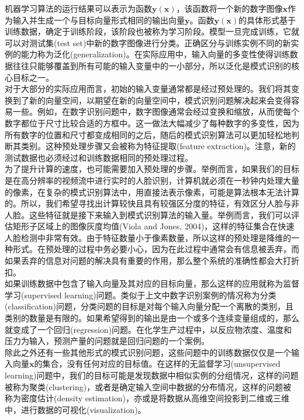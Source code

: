 \documentclass[b5paper]{book}
\numberwithin{equation}{chapter}
\begin{document}
{	\indent 机器学习算法的运行结果可以表示为函数$\textbf{y}(\textbf{x})$，该函数将一个新的数字图像$\textbf{x}$作为输入并生成一个与目标向量形式相同的输出向量$\textbf{y}$。函数$\textbf{y}(\textbf{x})$的具体形式基于训练数据，确定于训练阶段，该阶段也被称为学习阶段。模型一旦完成训练，它就可以对测试集(test set)中新的数字图像进行分类。正确区分与训练实例不同的新实例的能力称为泛化(generalization)。在实际应用中，输入向量的多变性使得训练数据往往只能够覆盖到所有可能的输入变量中的一小部分，所以泛化是模式识别的核心目标之一。\\
	\indent 对于大部分的实际应用而言，初始的输入变量通常都是经过预处理的。我们将其变换到了新的向量空间，以期望在新的向量空间中，模式识别问题解决起来会变得容易一些。例如，在数字识别问题中，数字图像通常会经过变换和缩放，从而使每个数字都位于尺寸比较合适的方框中。这一做法大幅减少了每种数字的多变性，因为所有数字的位置和尺寸都变成相同的之后，随后的模式识别算法可以更加轻松地判断其类别。这种预处理步骤又会被称为特征提取(feature extraction)。注意，新的测试数据也必须经过和训练数据相同的预处理过程。\\
	\indent 为了提升计算的速度，也可能需要加入预处理的步骤。举例而言，如果我们的目标是在高分辨率的视频流中进行实时的人脸识别，计算机就必须在一秒钟内处理大量的像素，在复杂的模式识别算法中，用直接法表示像素，可能是算法根本无法计算的。所以，我们希望寻找出计算较快且具有较强区分度的特征，有效区分人脸与非人脸。这些特征就是接下来输入到模式识别算法的输入量。举例而言，我们可以评估矩形子区域上的图像灰度均值(Viola and Jones, 2004)，这样的特征集合在快速人脸检测中非常有效。由于特征数量小于像素数量，所以这样的预处理是降维的一种形式。在预处理的过程中务必要小心，因为在此过程中通常会有信息被丢弃，而如果丢弃的信息对问题的解决具有重要的作用，那么整个系统的准确性都会大打折扣。\\
	\indent 如果训练数据中包含了输入向量及其对应的目标向量，那么这样的应用就称为监督学习(supervised learning)问题。类似于上文中数字识别案例的情况称为分类(classification)问题，分类问题的目标是对每个输入向量分配一个离散的类别，且类别的数量是有限的。如果希望得到的输出是由一个或多个连续变量组成的，那么就变成了一个回归(regression)问题。在化学生产过程中，以反应物浓度、温度和压力为输入，预测产量的问题就是回归问题的一个案例。\\
	\indent 除此之外还有一些其他形式的模式识别问题，这些问题中的训练数据仅仅是一个输入向量$\textbf{x}$的集合，没有任何对应的目标值。在这样的无监督学习(unsupervised learning)问题中，我们的目标可能是发现数据中相似实例的分组情况，这样的问题被称为聚类(clustering)，或者是确定输入空间中数据的分布情况，这样的问题被称为密度估计(density estimation)，亦或是将数据从高维空间投影到二维或三维中，进行数据的可视化(visualization)。\\
}
\end{document}
